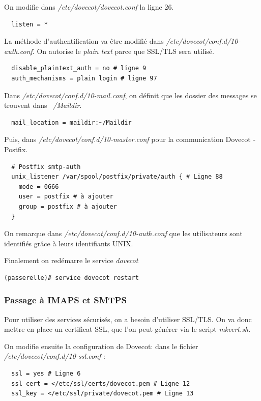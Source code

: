 \documentclass[a4paper]{article}
\begin{document}
On modifie dans \textit{/etc/dovecot/dovecot.conf} la ligne 26.
\begin{verbatim}
  listen = *
\end{verbatim}

La méthode d'authentification va être modifié dans 
\textit{/etc/dovecot/conf.d/10-auth.conf}. 
On autorise le \textit{plain text} parce que
SSL/TLS sera utilisé.
\begin{verbatim}
  disable_plaintext_auth = no # ligne 9
  auth_mechanisms = plain login # ligne 97
\end{verbatim}

Dans \textit{/etc/dovecot/conf.d/10-mail.conf}, on
définit que les dossier des messages se trouvent 
dans \textit{~/Maildir}.
\begin{verbatim}
  mail_location = maildir:~/Maildir
\end{verbatim}

Puis, dans \textit{/etc/dovecot/conf.d/10-master.conf}
pour la communication Dovecot - Postfix.
\begin{verbatim}
  # Postfix smtp-auth
  unix_listener /var/spool/postfix/private/auth { # Ligne 88
    mode = 0666
    user = postfix # à ajouter
    group = postfix # à ajouter
  } 
\end{verbatim}

On remarque dans \textit{/etc/dovecot/conf.d/10-auth.conf} que
les utilisateurs sont identifiés grâce à leurs identifiants
UNIX.

Finalement on redémarre le service \textit{dovecot}
\begin{verbatim}
(passerelle)# service dovecot restart 
\end{verbatim}

\subsubsection{Passage à IMAPS et SMTPS}

Pour utiliser des services sécurisés, on a besoin d'utiliser SSL/TLS.
On va donc mettre en place un certificat SSL, que l'on peut générer
via le script \textit{mkcert.sh}.

On modifie ensuite la configuration de Dovecot: dans le fichier
\textit{/etc/dovecot/conf.d/10-ssl.conf} :
\begin{verbatim}
  ssl = yes # Ligne 6
  ssl_cert = </etc/ssl/certs/dovecot.pem # Ligne 12
  ssl_key = </etc/ssl/private/dovecot.pem # Ligne 13
\end{verbatim}
\end{document}
